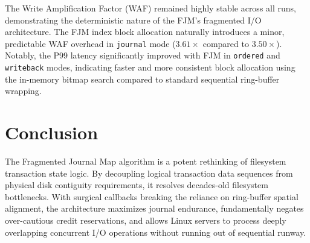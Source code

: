 \documentclass{article}
\begin{document}
The Write Amplification Factor (WAF) remained highly stable across all runs, demonstrating the deterministic nature of the FJM's fragmented I/O architecture. The FJM index block allocation naturally introduces a minor, predictable WAF overhead in \texttt{journal} mode ($3.61\times$ compared to $3.50\times$). Notably, the P99 latency significantly improved with FJM in \texttt{ordered} and \texttt{writeback} modes, indicating faster and more consistent block allocation using the in-memory bitmap search compared to standard sequential ring-buffer wrapping.

\section{Conclusion}
The Fragmented Journal Map algorithm is a potent rethinking of filesystem transaction state logic. By decoupling logical transaction data sequences from physical disk contiguity requirements, it resolves decades-old filesystem bottlenecks. With surgical callbacks breaking the reliance on ring-buffer spatial alignment, the architecture maximizes journal endurance, fundamentally negates over-cautious credit reservations, and allows Linux servers to process deeply overlapping concurrent I/O operations without running out of sequential runway.
\end{document}
